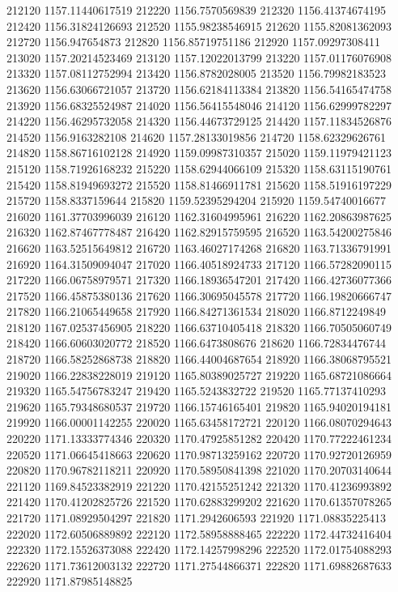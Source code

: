 {212120 1157.11440617519
212220 1156.7570569839
212320 1156.41374674195
212420 1156.31824126693
212520 1155.98238546915
212620 1155.82081362093
212720 1156.947654873
212820 1156.85719751186
212920 1157.09297308411
213020 1157.20214523469
213120 1157.12022013799
213220 1157.01176076908
213320 1157.08112752994
213420 1156.8782028005
213520 1156.79982183523
213620 1156.63066721057
213720 1156.62184113384
213820 1156.54165474758
213920 1156.68325524987
214020 1156.56415548046
214120 1156.62999782297
214220 1156.46295732058
214320 1156.44673729125
214420 1157.11834526876
214520 1156.9163282108
214620 1157.28133019856
214720 1158.62329626761
214820 1158.86716102128
214920 1159.09987310357
215020 1159.11979421123
215120 1158.71926168232
215220 1158.62944066109
215320 1158.63115190761
215420 1158.81949693272
215520 1158.81466911781
215620 1158.51916197229
215720 1158.8337159644
215820 1159.52395294204
215920 1159.54740016677
216020 1161.37703996039
216120 1162.31604995961
216220 1162.20863987625
216320 1162.87467778487
216420 1162.82915759595
216520 1163.54200275846
216620 1163.52515649812
216720 1163.46027174268
216820 1163.71336791991
216920 1164.31509094047
217020 1166.40518924733
217120 1166.57282090115
217220 1166.06758979571
217320 1166.18936547201
217420 1166.42736077366
217520 1166.45875380136
217620 1166.30695045578
217720 1166.19820666747
217820 1166.21065449658
217920 1166.84271361534
218020 1166.8712249849
218120 1167.02537456905
218220 1166.63710405418
218320 1166.70505060749
218420 1166.60603020772
218520 1166.6473808676
218620 1166.72834476744
218720 1166.58252868738
218820 1166.44004687654
218920 1166.38068795521
219020 1166.22838228019
219120 1165.80389025727
219220 1165.68721086664
219320 1165.54756783247
219420 1165.5243832722
219520 1165.77137410293
219620 1165.79348680537
219720 1166.15746165401
219820 1165.94020194181
219920 1166.00001142255
220020 1165.63458172721
220120 1166.08070294643
220220 1171.13333774346
220320 1170.47925851282
220420 1170.77222461234
220520 1171.06645418663
220620 1170.98713259162
220720 1170.92720126959
220820 1170.96782118211
220920 1170.58950841398
221020 1170.20703140644
221120 1169.84523382919
221220 1170.42155251242
221320 1170.41236993892
221420 1170.41202825726
221520 1170.62883299202
221620 1170.61357078265
221720 1171.08929504297
221820 1171.2942606593
221920 1171.08835225413
222020 1172.60506889892
222120 1172.58958888465
222220 1172.44732416404
222320 1172.15526373088
222420 1172.14257998296
222520 1172.01754088293
222620 1171.73612003132
222720 1171.27544866371
222820 1171.69882687633
222920 1171.87985148825
}
